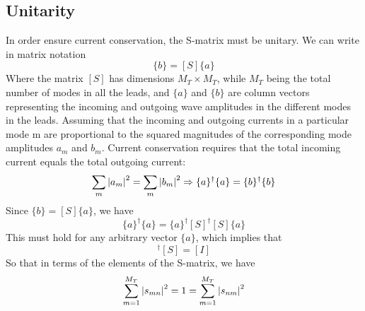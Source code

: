 \documentclass[11pt,a4paper]{book}
\theoremstyle{plain}
\theoremstyle{definition}
\theoremstyle{remark}
\begin{document}
\subsection{Unitarity}
In order ensure current conservation, the S-matrix must be unitary. We can write in matrix notation
\begin{equation}
    \{b\} = [S] \{a\}
\end{equation}
Where the matrix $[S]$ has dimensions $M_T \times M_T$, while $M_T$ being the total number of modes in all the leads, and $\{a\}$ and $\{b\}$ are column vectors representing the incoming and outgoing wave amplitudes in the different modes in the leads. Assuming that the incoming and outgoing currents in a particular mode m are proportional to the squared magnitudes of the corresponding mode amplitudes $a_m$ and $b_m$. Current conservation requires that the total incoming current equals the total outgoing current:
\begin{equation}
    \sum_m \abs{a_m}^2 = \sum_m \abs{b_m}^2 \Rightarrow \{a\}^\dagger \{a\} = \{b\}^\dagger \{b\}
\end{equation}
Since $\{b\} = [S] \{a\}$, we have
\begin{equation}
    \{a\}^\dagger \{a\} = \{a\}^\dagger [S]^\dagger [S] \{a\}
\end{equation}
This must hold for any arbitrary vector $\{a\}$, which implies that
\begin{equation}
    [S]^\dagger [S] = [I]
\end{equation}
So that in terms of the elements of the S-matrix, we have
\begin{equation}
    \sum_{m=1}^{M_T} \abs{s_{mn}}^2 = 1 = \sum_{m=1}^{M_T} \abs{s_{nm}}^2
\end{equation}
\end{document}
